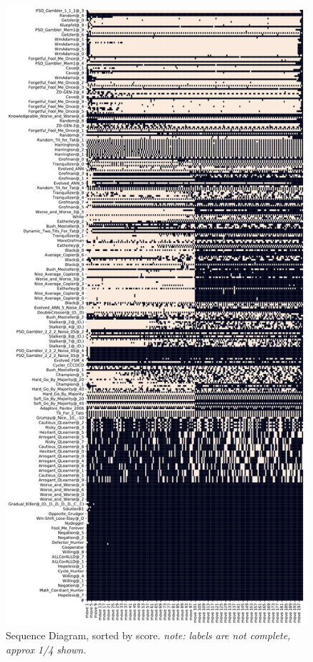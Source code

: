 \begin{figure}[ht]
\begin{minipage}{0.48\textwidth}
    \end{minipage}\hfill
    \begin{minipage}{0.48\textwidth}
        \includegraphics[width=1.0\textwidth, center]{./img/descriptive/sequence_plot_score_pt2.pdf}
    \end{minipage}
    \caption{Sequence Diagram, sorted by score. \textit{note: labels are not complete, approx 1/4 shown.}}\label{fig:sequence_plot_score}
\end{figure}


